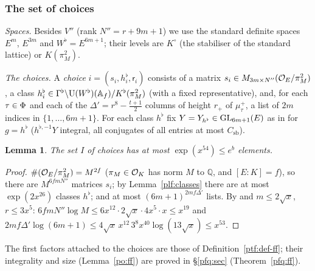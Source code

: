 \documentclass[10pt]{amsart}
\newtheorem{lemma}[theorem]{Lemma}
\theoremstyle{definition}
\theoremstyle{remark}
\newcommand{\Q}{\mathbb Q}
\begin{document}
\subsubsection{The set of choices}\label{plf:ss-ff}

\emph{Spaces.} Besides $V''$ (rank $N''=r+9m+1$) we use the standard definite
spaces $E^m$, $E^{3m}$ and $W^\flat=E^{6m+1}$; their levels are $K^\circ$ (the stabiliser of the
standard lattice) or $K(\pi_M^2)$.

\emph{The choices.} A \emph{choice} $i=(s_i,h^\flat_i,\mathsf r_i)$ consists of a matrix $s_i\in
M_{3m\times N''}(\auO_E/\pi_M^2)$, a class $h^\flat_i\in\Gamma^\flat\backslash\auU(W^\flat)(\auA_f)/
K^\flat(\pi_M^2)$ (with a fixed representative), and, for each $\tau\in\auPl$ and each of the
$\Delta'=r^8-\frac{t+1}2$ columns of height $r_+$ of $\mu^+_\tau$, a list of $2m$ indices in
$\{1,\dots,6m+1\}$. For each class $h^\flat$ fix $Y=Y_{h^\flat}\in\auGL_{6m+1}(E)$ as in
{\cite[Lemma~14.21]{P46}} for $g=h^\flat$ ($h^{\flat,-1}Y$ integral, all conjugates of all entries at
most $C_{\mathrm{sb}}$).

\begin{lemma}\label{plf:I}
The set $I$ of choices has at most $\exp(x^{54})\le e^b$ elements.
\end{lemma}
\begin{proof}
$\#(\auO_E/\pi_M^2)=M^{2f}$ ($\pi_M\in\auO_K$ has norm $M$ to $\Q$, and $[E:K]=f$), so there are
$M^{6fmN''}$ matrices $s_i$; by Lemma~\ref{plf:classes} there are at most $\exp(2x^{26})$ classes
$h^\flat$; and at most $(6m+1)^{2mf\Delta'}$ lists. By {\cite[(36) and~(38)]{P46}} and
$m\le2\sqrt x$, $r\le3x^5$: $6fmN''\log M\le6x^{12}\cdot2\sqrt x\cdot4x^5\cdot x\le x^{19}$ and
$2mf\Delta'\log(6m+1)\le4\sqrt x\,x^{12}\,3^8x^{40}\log(13\sqrt x)\le x^{53}$.
\end{proof}

The first factors attached to the choices are those of Definition~\ref{ptf:def-ff}; their
integrality and size (Lemma~\ref{po:ff}) are proved in \S\ref{pfq:sec} (Theorem~\ref{pfq:ff}).





\providecommand{\auO}{\mathcal O}
\providecommand{\auU}{\mathrm U}
\providecommand{\auGL}{\mathrm{GL}}
\providecommand{\auHom}{\operatorname{Hom}}
\providecommand{\auA}{\mathbb A}
\providecommand{\auF}{\mathbb F}
\providecommand{\auPl}{\Phi}
\providecommand{\auG}{\overline G}
\providecommand{\aubar}[1]{\overline{#1}}
\providecommand{\plone}{\mathbf 1}
\providecommand{\psrho}{\varrho}
\providecommand{\poA}{\mathcal A}
\providecommand{\poZ}{\mathcal Z}
\providecommand{\pop}{\mathsf p}
\providecommand{\pog}{\mathsf g}
\providecommand{\ppeD}{\mathcal D}
\providecommand{\ppeVan}{\mathrm{Van}}
\providecommand{\ppeS}{\mathcal S}
\providecommand{\ppeH}{\mathbb H}
\providecommand{\ppeN}{\mathsf N}
\providecommand{\pexK}{K^{(z)}}
\end{document}
